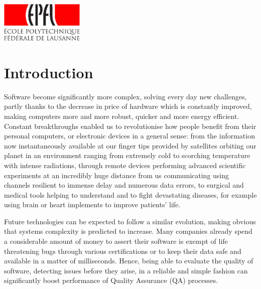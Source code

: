 \documentclass[a4paper,twoside]{article}
\makeatletter
\let\oldsection\section
\renewcommand\section{\cleardoublepage\oldsection}
\newcommand*{\flipmargins}{%
  \clearpage
  \setlength{\@tempdima}{\oddsidemargin}%
  \setlength{\oddsidemargin}{\evensidemargin}%
  \setlength{\evensidemargin}{\@tempdima}%
  \if@reversemargin
    \normalmarginpar
  \else
    \reversemarginpar
  \fi
}
\makeatother
\begin{document}
\begin{center}
    \includegraphics[width = 40mm]{res/epfl-logo}
\end{center}

\clearpage\null\newpage


\restoregeometry              %
\flipmargins
\pagestyle{mystyle_no_header}

\tableofcontents


\clearpage
\pagestyle{mystyle}

\section{Introduction}

Software become significantly more complex, solving every day new challenges,
partly thanks to the decrease in price of hardware which is constantly improved,
making computers more and more robust, quicker and more energy efficient.
Constant breakthroughs enabled us to revolutionise how people benefit from their
personal computers, or electronic devices in a general sense: from the
information now instantaneously available at our finger tips provided by
satellites orbiting our planet in an environment ranging from extremely cold to
scorching temperature with intense radiations, through remote devices performing
advanced scientific experiments at an incredibly huge distance from us
communicating using channels resilient to immense delay and numerous data
errors, to surgical and medical tools helping to understand and to fight
devastating diseases, for example using brain or heart implements to improve
patients' life.

Future technologies can be expected to follow a similar evolution, making
obvious that systems complexity is predicted to increase. Many companies already
spend a considerable amount of money to assert their software is exempt of life
threatening bugs through various certifications or to keep their data safe and
available in a matter of milliseconds. Hence, being able to evaluate the quality
of software, detecting issues before they arise, in a reliable and simple
fashion can significantly boost performance of Quality Assurance (QA) processes.
\end{document}
